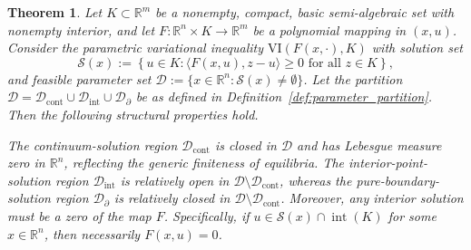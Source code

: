 \documentclass[sn-basic,Numbered]{sn-jnl}
\theoremstyle{thmstyleone}%
\newtheorem{theorem}{Theorem}%
\begin{document}
\begin{theorem}\label{thm:structural_properties_general}
Let $K \subset \mathbb{R}^m$ be a nonempty, compact, basic semi-algebraic set with nonempty interior, and let $F : \mathbb{R}^n \times K \to \mathbb{R}^m$ be a polynomial mapping in $(x, u)$. Consider the parametric variational inequality $\mathrm{VI}(F(x,\cdot), K)$ with solution set
\[
\mathcal{S}(x) := \left\{ u \in K : \langle F(x, u), z - u \rangle \ge 0 \text{ for all } z \in K \right\},
\]
and feasible parameter set $\mathcal{D} := \{ x \in \mathbb{R}^n : \mathcal{S}(x) \neq \emptyset \}$. Let the partition $\mathcal{D} = \mathcal{D}_{\mathrm{cont}} \cup \mathcal{D}_{\mathrm{int}} \cup \mathcal{D}_{\partial}$ be as defined in Definition~\ref{def:parameter_partition}. Then the following structural properties hold.

The continuum-solution region $\mathcal{D}_{\mathrm{cont}}$ is closed in $\mathcal{D}$ and has Lebesgue measure zero in $\mathbb{R}^n$, reflecting the generic finiteness of equilibria. The interior-point-solution region $\mathcal{D}_{\mathrm{int}}$ is relatively open in $\mathcal{D} \setminus \mathcal{D}_{\mathrm{cont}}$, whereas the pure-boundary-solution region $\mathcal{D}_{\partial}$ is relatively closed in $\mathcal{D} \setminus \mathcal{D}_{\mathrm{cont}}$. Moreover, any interior solution must be a zero of the map $F$. Specifically, if $u \in \mathcal{S}(x) \cap \operatorname{int}(K)$ for some $x \in \mathbb{R}^n$, then necessarily $F(x, u) = 0$.
\end{theorem}
\end{document}
